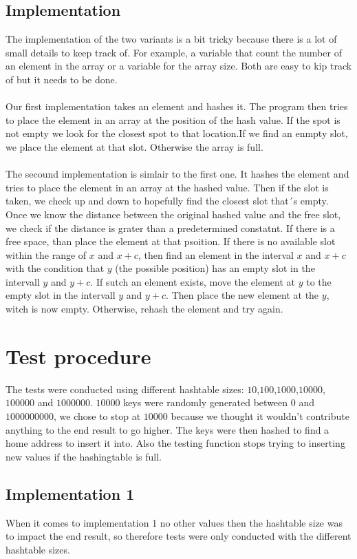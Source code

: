 \documentclass[paper=a4, fontsize=11pt]{scrartcl}
\numberwithin{equation}{section}		%
\numberwithin{figure}{section}			%
\numberwithin{table}{section}				%
\begin{document}
\subsection{Implementation}
The implementation of the two variants is a bit tricky because there is a lot of small details to keep track of. For example, a variable that count the number of an element in the array or a variable for the array size. Both are easy to kip track of but it needs to be done.\\~\\
Our first implementation takes an element and hashes it. The program then tries to place the element in an array at the position of the hash value. If the spot is not empty we look for the closest spot to that location.If we find an enmpty slot, we place the element at that slot. Otherwise the array is full.\\~\\
The secound implementation is simlair to the first one. It hashes the element and tries to place the element in an array at the hashed value. Then if the slot is taken, we check up and down to hopefully find the closest slot that´s empty. Once we know the distance between the original hashed value and the free slot, we check if the distance is grater than a predetermined constatnt. If there is a free space, than place the element at that psoition. If there is no available slot within the range of $x$ and $x+c$, then find an element in the interval $x$ and $x+c$ with the condition that $y$ (the possible position) has an empty slot in the intervall $y$ and $y+c$. If sutch an element exists, move the element at $y$ to the empty slot in the intervall $y$ and $y+c$. Then place the new element at the $y$, witch is now empty. Otherwise, rehash the element and try again.



\section{Test procedure}
The tests were conducted using different hashtable sizes: $10$,$100$,$1000$,$10000$,$100000$ and $1000000$. $10000$ keys were randomly generated between $0$ and $1 000 000 000$, we chose to stop at $10000$ because we thought it wouldn't contribute anything to the end result to go higher. The keys were then hashed to find a home address to insert it into. Also the testing function stops trying to inserting new values if the hashingtable is full.
\subsection{Implementation 1}
When it comes to implementation 1 no other values then the hashtable size was to impact the end result, so therefore tests were only conducted with the different hashtable sizes.
\end{document}
